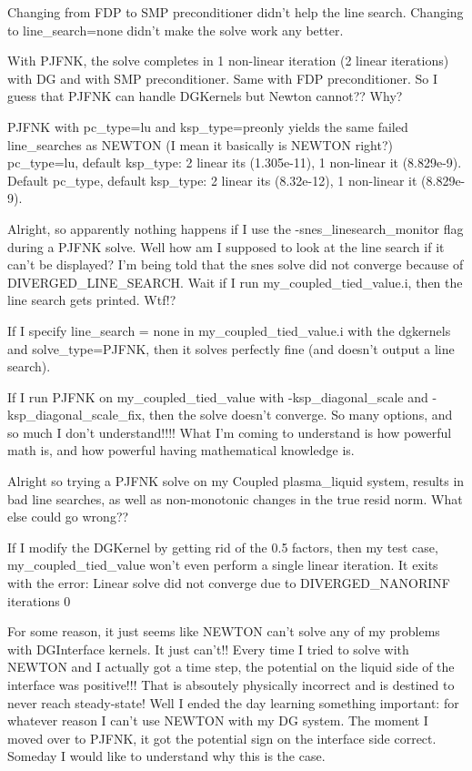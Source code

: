 {Changing from FDP to SMP preconditioner didn't help the line search. Changing to line_search=none didn't make the solve work any better.

With PJFNK, the solve completes in 1 non-linear iteration (2 linear iterations) with DG and with SMP preconditioner. Same with FDP preconditioner. So I guess that PJFNK can handle DGKernels but Newton cannot?? Why?

PJFNK with pc_type=lu and ksp_type=preonly yields the same failed line_searches as NEWTON (I mean it basically is NEWTON right?) pc_type=lu, default ksp_type: 2 linear its (1.305e-11), 1 non-linear it (8.829e-9). Default pc_type, default ksp_type: 2 linear its (8.32e-12), 1 non-linear it (8.829e-9).

Alright, so apparently nothing happens if I use the -snes_linesearch_monitor flag during a PJFNK solve. Well how am I supposed to look at the line search if it can't be displayed? I'm being told that the snes solve did not converge because of DIVERGED_LINE_SEARCH. Wait if I run my_coupled_tied_value.i, then the line search gets printed. Wtf!?

If I specify line_search = none in my_coupled_tied_value.i with the dgkernels and solve_type=PJFNK, then it solves perfectly fine (and doesn't output a line search).

If I run PJFNK on my_coupled_tied_value  with -ksp_diagonal_scale and -ksp_diagonal_scale_fix, then the solve doesn't converge. So many options, and so much I don't understand!!!! What I'm coming to understand is how powerful math is, and how powerful having mathematical knowledge is.

Alright so trying a PJFNK solve on my Coupled plasma_liquid system, results in bad line searches, as well as non-monotonic changes in the true resid norm. What else could go wrong??

If I modify the DGKernel by getting rid of the 0.5 factors, then my test case, my_coupled_tied_value won't even perform a single linear iteration. It exits with the error: Linear solve did not converge due to DIVERGED_NANORINF iterations 0

For some reason, it just seems like NEWTON can't solve any of my problems with DGInterface kernels. It just can't!! Every time I tried to solve with NEWTON and I actually got a time step, the potential on the liquid side of the interface was positive!!! That is absoutely physically incorrect and is destined to never reach steady-state! Well I ended the day learning something important: for whatever reason I can't use NEWTON with my DG system. The moment I moved over to PJFNK, it got the potential sign on the interface side correct. Someday I would like to understand why this is the case.

}
